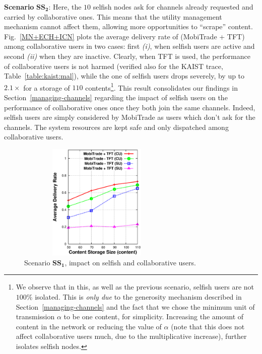 \noindent \textbf{Scenario} $\mathbf{SS_2}$: Here, the $10$ selfish nodes ask for channels already requested and carried by collaborative ones. This means that the utility management mechanism cannot affect them, allowing more opportunities to ``scrape'' content. Fig.~\ref{MN+ECH+ICN} plots the average delivery rate of (MobiTrade + TFT) among collaborative users in two cases: first \emph{(i)}, when selfish users are active and second \emph{(ii)} when they are inactive. Clearly, when TFT is used, the performance of collaborative users is not harmed (verified also for the KAIST trace, Table~\ref{table:kaist:mal}), while the one of selfish users drops severely, by up to $2.1\times$ for a storage of $110$ contents\footnote{We observe that in this, as well as the previous scenario, selfish users are not $100\%$ isolated. This is \emph{only due} to the generosity mechanism described in Section~\ref{managing-channels} and the fact that we chose the minimum unit of transmission $\alpha$ to be one content, for simplicity. Increasing the amount of content in the network or reducing the value of $\alpha$ (note that this does not affect collaborative users much, due to the multiplicative increase), further isolates selfish nodes.}. This result consolidates our findings in Section~\ref{managing-channels} regarding the impact of selfish users on the performance of collaborative ones once they both join the same channels. Indeed, selfish users are simply considered by MobiTrade as users which don't ask for the channels. The system resources are kept safe and only dispatched among collaborative users.

\begin{figure}[!h]
  \begin{center}
    \includegraphics[width=3in,height=2.2in]{Chapitre5/fig1.eps}
  \end{center}
  \caption{Scenario $\mathbf{SS_1}$, impact on selfish and collaborative users.}
  \label{SS-Scenario-1}
\end{figure}

